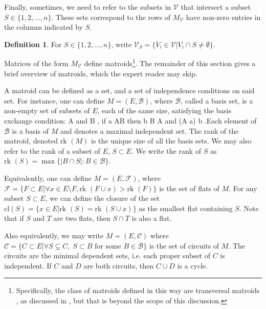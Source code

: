 \documentclass[11pt]{article}
\newcommand{\rk}{\textrm{rk }}
\def\bas #1\eas{\begin{align*} #1 \end{align*}}
\newcommand{\cV}{\mathcal{V}}
\newcommand{\cB}{\mathcal{B}}
\theoremstyle{remark}
\theoremstyle{definition}
\newtheorem{dfn}[thm]{Definition}
\begin{document}
Finally, sometimes, we need to refer to the subsets in $\cV$ that intersect a subset  $S \in \{1,2,\dots,n\}$. These sets correspond to the rows of $M_{\cV}$ have non-zero entries in the columns indicated by $S$. 

\begin{dfn}\label{dfn:columns}
For $S \in \{1,2,\dots,n\}$, write $\cV_S =\{V_i \in \cV |  V_i \cap S \neq \emptyset\}$. 
\end{dfn}

Matrices of the form $M_\cV$ define matroids\footnote{Specifically, the class of matroids defined in this way are transversal matroids \cite{Transversal}, as discussed in \cite{basisshapeloci}, but that is beyond the scope of this discussion.}. The remainder of this section gives a brief overview of matroids, which the expert reader may skip. 

A matroid can be defined as a set, and a set of independence conditions on said set. For instance, one can define $M = (E, \mathcal{B})$, where $\mathcal{B}$, called a basis set, is a non-empty set of subsets of $E$, each of the same size, satisfying the basis exchange condition: \bas \textrm{for  all } A \textrm{ and } B \in \cB, \textrm{ if }  a \in A\setminus B \textrm{ then } \exists b \in B \setminus A \textrm{ and } (A \setminus a) \cup b \in  \cB \;.\eas Each element of $$ is a basis of $M$ and denotes a maximal independent set. The rank of the matroid, denoted $\rk(M)$ is the unique size of all the basis sets. We may also refer to the rank of a subset of $E$, $S \subset E$. We write the rank of $S$ as $\rk(S) = \max \{|B \cap S| : B \in \mathcal{B} \}$.%

Equivalently, one can define $M = (E, \mathcal{F})$, where $\mathcal{F} = \{ F \subset E| \forall x \in E \setminus F, \rk(F \cup x) > \rk(F)\}$ is the set of flats of $M$. For any subset $S \subset E$, we can define the closure of the set $\textrm{cl}(S)  = \{x \in E | \rk(S) = \rk(S \cup x)\}$ as the smallest flat containing $S$. Note that if $S$ and $T$ are two flats, then $S \cap T$ is also a flat. 

Also equivalently, we may write $M = (E, \mathcal{C})$ where $\mathcal{C} = \{C \subset E | \forall S \subsetneq C, \; S \subset B \textrm{ for some } B \in \mathcal{B}\}$ is the set of circuits of $M$. The circuits are the minimal dependent sets, i.e. each proper subset of $C$ is independent. If $C$ and $D$ are both circuits, then $C \cup D$ is a cycle. 
\end{document}

